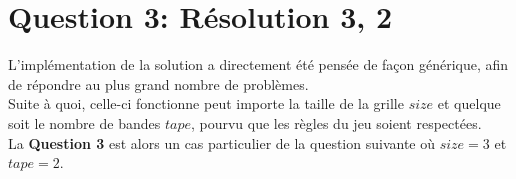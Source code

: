 \documentclass[a4paper,12pt]{report}
\begin{document}
\pagebreak



%
%
%
%
%
%
%
%

\chapter{Question 3: Résolution 3, 2}

L'implémentation de la solution a directement été pensée de façon générique, afin de répondre au plus grand nombre de problèmes.\\
Suite à quoi, celle-ci fonctionne peut importe la taille de la grille $size$ et quelque soit le nombre de bandes $tape$, pourvu que les règles du jeu soient respectées. \\

La \textbf{Question 3} est alors un cas particulier de la question suivante où $size=3$ et $tape=2$.\\
\end{document}
